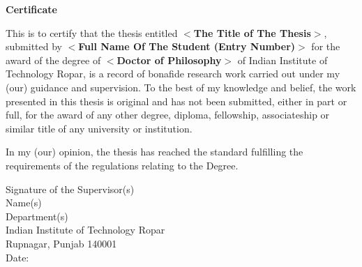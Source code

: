 




\begin{center}
{\LARGE \textbf{Certificate}}
\end{center}


This is to certify that the thesis entitled \textbf{$<$The Title of The Thesis$>$}, submitted by \textbf{$<$Full Name Of The Student (Entry Number)$>$} for the award of the degree of \textbf{$<$Doctor of Philosophy$>$} of Indian Institute of Technology Ropar, is a record of bonafide research work carried out under my (our) guidance and supervision. To the best of my knowledge and belief, the work presented in this thesis is original and has not been submitted, either in part or full, for the award of any other degree, diploma, fellowship,
associateship or similar title of any university or institution.

In my (our) opinion, the thesis has reached the standard fulfilling the requirements of the regulations relating to the Degree.\\[1 cm]


\begin{flushright}
Signature of the Supervisor(s)\\
Name(s)\\
Department(s)\\
Indian Institute of Technology Ropar\\
Rupnagar, Punjab 140001\\
Date:
\end{flushright}

\newpage